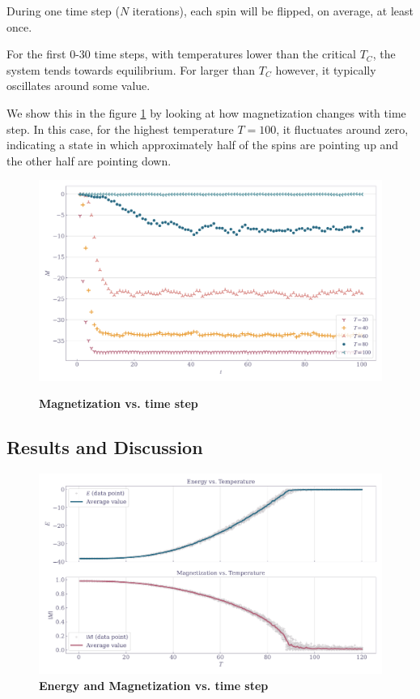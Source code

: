 \documentclass[11pt,a4paper]{article}
\begin{document}
During one time step ($N$ iterations), each spin will be flipped, on average, at least once.

For the first 0-30 time steps, with temperatures lower than the critical $T_C$, the system tends towards equilibrium. For larger than $T_C$ however, it typically oscillates around some value.

We show this in the figure \ref{fig:mag_vs_time} by looking at how magnetization changes with time step. In this case, for the highest temperature $T=100$, it fluctuates around zero, indicating a state in which approximately half of the spins are pointing up and the other half are pointing down.

\begin{figure}[ht!]
    \centering
    \caption{\textbf{Magnetization vs. time step}}
    \includegraphics[width=\linewidth]{../figures/magnet_vs_steps.pdf}
    \label{fig:mag_vs_time}
\end{figure}

\subsection{Results and Discussion}

\begin{figure}[ht!]
    \centering
    \caption{\textbf{Energy and Magnetization vs. time step}}
    \includegraphics[width=\linewidth]{../figures/energy_magnet_vs_temp.pdf}
\end{figure}
\end{document}

